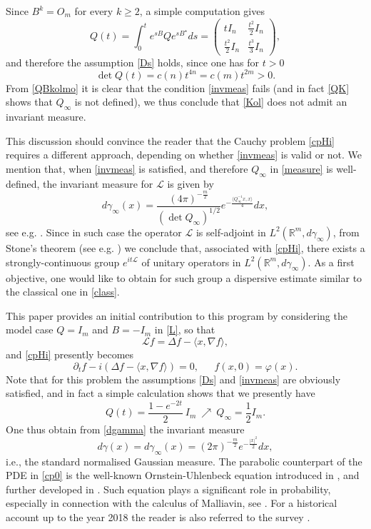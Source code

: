 \documentclass[11pt,a4paper]{amsart}
\def \vf{\varphi}
\newcommand{\Rm}{\mathbb R^m}
\newcommand{\p}{\partial}
\numberwithin{equation}{section}
\newcommand{\sa}{\langle}
\newcommand{\da}{\rangle}
\numberwithin{equation}{section}
\begin{document}
Since $B^k = O_m$ for every $k\ge 2$, a simple computation gives 
\begin{equation}\label{QK}
Q(t)= \int_0^t e^{sB}Q e^{sB^\star} ds = \begin{pmatrix} tI_n & \frac{t^2}2 I_n\\ \frac{t^2}2 I_n & \frac{t^3}3 I_n\end{pmatrix},
\end{equation}
and therefore the assumption \eqref{Ds} holds, since one has for $t>0$
\begin{equation}\label{detkol}
\det Q(t) = c(n) t^{4n} = c(m) t^{2m}>0.
\end{equation}
From  \eqref{QBkolmo} it is clear that the condition \eqref{invmeas} fails (and in fact \eqref{QK} shows that $Q_\infty$ is not defined), we thus conclude that \eqref{Kol} does not admit an invariant measure. 

This discussion should convince the reader that the Cauchy problem \eqref{cpHi} requires a different approach, depending on whether \eqref{invmeas} is valid or not.  We mention that, when \eqref{invmeas} is satisfied, and therefore $Q_\infty$ in \eqref{measure} is well-defined, the invariant measure for $\mathscr L$ is given by
\begin{equation}\label{dgamma}
d\gamma_\infty(x) = \frac{(4\pi)^{-\frac m2}}{(\det Q_\infty)^{1/2}} e^{-\frac{\sa Q_\infty^{-1}x,x\da}4} dx,
\end{equation}
see e.g. \cite[Proposition 2.3]{BG&liar}. Since in such case the operator $\mathscr L$ is self-adjoint in $L^2(\Rm,d\gamma_\infty)$, from Stone's theorem (see e.g. \cite[Theorem 1, p. 345]{Yo}) we conclude that, associated with \eqref{cpHi}, there exists a strongly-continuous group $e^{i t \mathscr L}$ of unitary operators in $L^2(\Rm,d\gamma_\infty)$. As a first objective, one would like to obtain for such group a dispersive estimate similar to the classical one in \eqref{class}.

 This paper provides an initial contribution to this program by considering the model case $Q = I_m$ and $B = - I_m$ in \eqref{L}, so that 
\[
\mathscr L f= \Delta f - \sa x,\nabla f\da,
\] 
and \eqref{cpHi} presently becomes  
\begin{equation}\label{cp0}
\p_t f - i \left(\Delta f - \sa x,\nabla f\da\right) = 0, \ \ \ \ \ \ \ f(x,0) = \vf(x).
\end{equation}
Note that for this problem the assumptions \eqref{Ds} and \eqref{invmeas} are obviously satisfied, and in fact
a simple calculation shows that we presently have
\[
Q(t) = \frac{1- e^{-2t}}{2}\ I_m\ \nearrow\ Q_\infty = \frac 12 I_m. 
\]
One thus obtain from \eqref{dgamma}  the invariant measure
\[
d\gamma(x) = d\gamma_\infty(x) = (2\pi)^{-\frac m2} e^{-\frac{|x|^2}2} dx,
\]
i.e., the standard normalised Gaussian measure. 
The parabolic counterpart of the PDE in \eqref{cp0} is the well-known Ornstein-Uhlenbeck  equation
introduced in \cite{OU}, and further developed in \cite{WU}. Such equation  plays a significant role in probability, especially in connection with the calculus of Malliavin, see \cite[Chap. 2]{SS}. For a historical account up to the year 2018 the reader is also referred to the survey \cite{Bo2}. 
\end{document}
